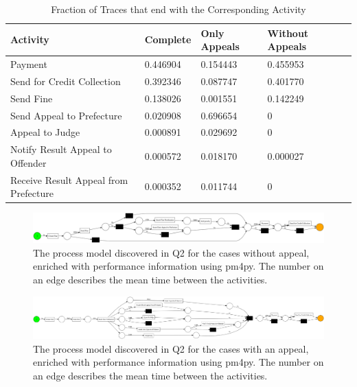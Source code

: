 \documentclass[12pt]{report}
\begin{document}
\begin{table}[H]
\centering
\begin{tabular}{|l|l|l|l|l|}
\hline \textbf{Activity} & \textbf{Complete} & \textbf{Only Appeals} & \textbf{Without Appeals} \\
\hline Payment  & 0.446904 & 0.154443 & 0.455953\\
\hline Send for Credit Collection & 0.392346 & 0.087747 & 0.401770\\
\hline Send Fine  & 0.138026 & 0.001551 & 0.142249\\
\hline Send Appeal to Prefecture  & 0.020908 & 0.696654 & 0\\
\hline Appeal to Judge & 0.000891 & 0.029692 &0\\
\hline Notify Result Appeal to Offender & 0.000572 & 0.018170 & 0.000027\\
\hline Receive Result Appeal from Prefecture & 0.000352 & 0.011744 & 0\\
\hline
\end{tabular}
\caption{Fraction of Traces that end with the Corresponding Activity}
\label{tab:1c_end}
\end{table}

\begin{figure}[H]
  \centering
  \includegraphics[width=\textwidth]{figures/no_appeals_performance.png}
  \caption{The process model discovered in Q2 for the cases without appeal, enriched with performance information using pm4py. The number on an edge describes the mean time between the activities.}
  \label{fig:no_appeals_performance}
\end{figure}

\begin{figure}[H]
  \centering
  \includegraphics[width=\textwidth]{figures/appeals_performance.png}
  \caption{The process model discovered in Q2 for the cases with an appeal, enriched with performance information using pm4py. The number on an edge describes the mean time between the activities.}
  \label{fig:appeals_performance}
\end{figure}
\end{document}
